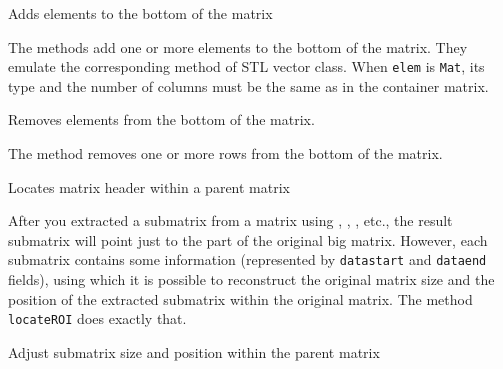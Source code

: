\label{Mat.push.back}
Adds elements to the bottom of the matrix

\begin{description}
\end{description}

The methods add one or more elements to the bottom of the matrix. They emulate the corresponding method of STL vector class. When \texttt{elem} is \texttt{Mat}, its type and the number of columns must be the same as in the container matrix.

\label{Mat.pop.back}
Removes elements from the bottom of the matrix.

\begin{description}
\end{description}

The method removes one or more rows from the bottom of the matrix.

Locates matrix header within a parent matrix

\begin{description}
\end{description}

After you extracted a submatrix from a matrix using , , ,  etc., the result submatrix will point just to the part of the original big matrix. However, each submatrix contains some information (represented by \texttt{datastart} and \texttt{dataend} fields), using which it is possible to reconstruct the original matrix size and the position of the extracted submatrix within the original matrix. The method \texttt{locateROI} does exactly that.

Adjust submatrix size and position within the parent matrix

